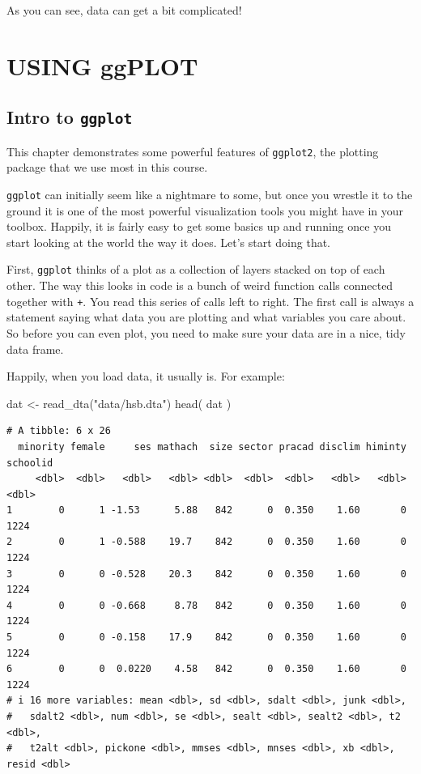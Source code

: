 \documentclass[
  letterpaper,
  DIV=11,
  numbers=noendperiod]{scrreprt}
\newenvironment{Shaded}{\begin{snugshade}}{\end{snugshade}}
\newcommand{\FunctionTok}[1]{\textcolor[rgb]{0.02,0.16,0.49}{#1}}
\newcommand{\NormalTok}[1]{\textcolor[rgb]{0.00,0.44,0.13}{#1}}
\newcommand{\OtherTok}[1]{\textcolor[rgb]{0.00,0.44,0.13}{#1}}
\newcommand{\StringTok}[1]{\textcolor[rgb]{0.25,0.44,0.63}{#1}}
\begin{document}
As you can see, data can get a bit complicated!

\part{USING ggPLOT}

\hypertarget{intro-to-ggplot}{%
\chapter{\texorpdfstring{Intro to
\texttt{ggplot}}{Intro to ggplot}}\label{intro-to-ggplot}}

This chapter demonstrates some powerful features of \texttt{ggplot2},
the plotting package that we use most in this course.

\texttt{ggplot} can initially seem like a nightmare to some, but once
you wrestle it to the ground it is one of the most powerful
visualization tools you might have in your toolbox. Happily, it is
fairly easy to get some basics up and running once you start looking at
the world the way it does. Let's start doing that.

First, \texttt{ggplot} thinks of a plot as a collection of layers
stacked on top of each other. The way this looks in code is a bunch of
weird function calls connected together with \texttt{+}. You read this
series of calls left to right. The first call is always a statement
saying what data you are plotting and what variables you care about. So
before you can even plot, you need to make sure your data are in a nice,
tidy data frame.

Happily, when you load data, it usually is. For example:

\begin{Shaded}
\begin{Highlighting}[]
\NormalTok{dat }\OtherTok{\textless{}{-}} \FunctionTok{read\_dta}\NormalTok{(}\StringTok{"data/hsb.dta"}\NormalTok{)}
\FunctionTok{head}\NormalTok{( dat )}
\end{Highlighting}
\end{Shaded}

\begin{verbatim}
# A tibble: 6 x 26
  minority female     ses mathach  size sector pracad disclim himinty schoolid
     <dbl>  <dbl>   <dbl>   <dbl> <dbl>  <dbl>  <dbl>   <dbl>   <dbl>    <dbl>
1        0      1 -1.53      5.88   842      0  0.350    1.60       0     1224
2        0      1 -0.588    19.7    842      0  0.350    1.60       0     1224
3        0      0 -0.528    20.3    842      0  0.350    1.60       0     1224
4        0      0 -0.668     8.78   842      0  0.350    1.60       0     1224
5        0      0 -0.158    17.9    842      0  0.350    1.60       0     1224
6        0      0  0.0220    4.58   842      0  0.350    1.60       0     1224
# i 16 more variables: mean <dbl>, sd <dbl>, sdalt <dbl>, junk <dbl>,
#   sdalt2 <dbl>, num <dbl>, se <dbl>, sealt <dbl>, sealt2 <dbl>, t2 <dbl>,
#   t2alt <dbl>, pickone <dbl>, mmses <dbl>, mnses <dbl>, xb <dbl>, resid <dbl>
\end{verbatim}
\end{document}

